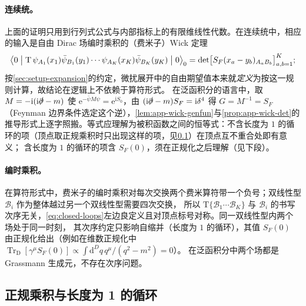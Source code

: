 \documentclass[UTF8,a4paper,11pt,fontset=fandol]{ctexart}
\theoremstyle{cplain}
\theoremstyle{cdefinition}
\theoremstyle{cremark}
\numberwithin{equation}{section}
\newcommand{\TrD}{\operatorname{Tr}_{\mathrm{D}}}   %
\newcommand{\sla}[1]{\slashed{#1}}                  %
\newcommand{\dd}{\mathrm{d}}                         %
\newcommand{\SF}{S_{F}}                              %
\newcommand{\ii}{\mathrm{i}}                        %
\newcommand{\ee}{\mathrm{e}}                        %
\begin{document}
\paragraph{连续统。}
上面的证明只用到行列式公式与内部指标上的有限维线性代数。在连续统中，相应的输入是自由 Dirac 场编时乘积的（费米子）Wick 定理
\begin{equation}\label{eq:app-wick-continuum}
\bigl\langle0\bigm|\mathrm T\,\psi_{A_1}(x_1)\bar\psi_{B_1}(y_1)\cdots\psi_{A_K}(x_K)\bar\psi_{B_K}(y_K)\bigm|0\bigr\rangle_0
=\det\bigl[\SF(x_a-y_b)_{A_aB_b}\bigr]_{a,b=1}^{K};
\end{equation}
按\cref{sec:setup-expansion}的约定，微扰展开中的自由期望值本来就\emph{定义}为按这一规则计算，故结论在逻辑上不依赖于算符形式。
在泛函积分的语言中，取 $M=-\ii(\ii\sla\partial-m)$ 使 $\ee^{-\bar\psi M\psi}=\ee^{\ii S_0}$，由 $(\ii\sla\partial-m)\SF=\ii\delta^4$ 得
$G=M^{-1}=\SF$（Feynman 边界条件选定这个逆），\cref{lem:app-wick-genfun}与\cref{prop:app-wick-det}的推导形式上逐字照搬。等式应理解为被积函数之间的恒等式：不含长度为 $1$ 的循环的项（顶点取正规乘积时只出现这样的项，见\cref{app:wick-normal}）在顶点互不重合处即有意义；
含长度为 $1$ 的循环的项含 $\SF(0)$，须在正规化之后理解（见下段）。

\paragraph{编时乘积。}
在算符形式中，费米子的编时乘积对每次交换两个费米算符带一个负号；双线性型 $\mathcal B_i$ 作为整体越过另一个双线性型需要四次交换，
所以 $\mathrm T\{\mathcal B_1\cdots\mathcal B_K\}$ 与 $\mathcal B_i$ 的书写次序无关，\cref{eq:closed-loops}左边良定义且对顶点标号对称。同一双线性型内两个场处于同一时刻，
其次序约定只影响自缩并（长度为 $1$ 的循环），其值 $\SF(0)$ 由正规化给出（例如在维数正规化中 $\TrD[\gamma^\mu\SF(0)]\propto\int\dd^Dq\,q^\mu/(q^2-m^2)=0$）。
在泛函积分中两个场都是 Grassmann 生成元，不存在次序问题。

\subsection{正规乘积与长度为 1 的循环}\label{app:wick-normal}
\end{document}
